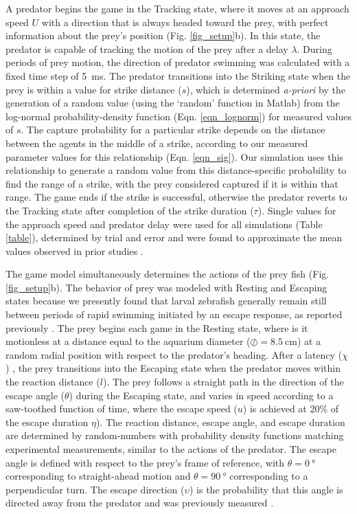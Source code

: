 \documentclass[]{rsos}%
\begin{document}
A predator begins the game in the Tracking state, where it moves at an approach speed $U$ with a direction that is always headed toward the prey, with perfect information about the prey's position (Fig. \ref{fig_setup}b). 
In this state, the predator is capable of tracking the motion of the prey after a delay $\lambda$.
During periods of prey motion, the direction of predator swimming was calculated with a fixed time step of \SI{5}{\ms}.  
The predator transitions into the Striking state when the prey is within a value for strike distance ($s$), which is determined \textit{a-priori} by the generation of a random value (using the `random' function in Matlab) from the log-normal probability-density function (Eqn. \ref{eqn_lognorm}) for measured values of $s$.
The capture probability for a particular strike depends on the distance between the agents in the middle of a strike, according to our measured parameter values for this relationship (Eqn. \ref{eqn_sig}).
Our simulation uses this relationship to generate a random value from this distance-specific probability to find the range of a strike, with the prey considered captured if it is within that range.
The game ends if the strike is successful, otherwise the predator reverts to the Tracking state after completion of the strike duration ($\tau$).
Single values for the approach speed and predator delay were used for all simulations (Table \ref{table}), determined by trial and error and were found to approximate the mean values observed in prior studies \cite{McHenry:2005tc, Stewart:2013bha}. 

The game model simultaneously determines the actions of the prey fish (Fig. \ref{fig_setup}b).
The behavior of prey was modeled with Resting and Escaping states because we presently found that larval zebrafish generally remain still between periods of rapid swimming initiated by an escape response, as reported previously \cite{Stewart:2013bha, Stewart:2014cma}. 
The prey begins each game in the Resting state, where is it motionless at a distance equal to the aquarium diameter ($\oslash = \SI{8.5}{\cm}$) at a random radial position with respect to the predator's heading.
After a latency ($\chi$) \cite{Nair:2015gk}, the prey transitions into the Escaping state when the predator moves within the reaction distance ($l$).
The prey follows a straight path in the direction of the escape angle ($\theta$) during the Escaping state, and varies in speed according to a saw-toothed function of time, where the escape speed ($u$) is achieved at 20\% of the escape duration $\eta$).
The reaction distance, escape angle, and escape duration are determined by random-numbers with probability density functions matching experimental measurements, similar to the actions of the predator.
The escape angle is defined with respect to the prey's frame of reference, with $\theta =  \SI{0}{\degree}$ corresponding to straight-ahead motion and $\theta = \SI{90}{\degree}$ corresponding to a perpendicular turn.
The escape direction ($\upsilon$) is the probability that this angle is directed away from the predator and was previously measured \cite{Stewart:2014cma}.
\end{document}
